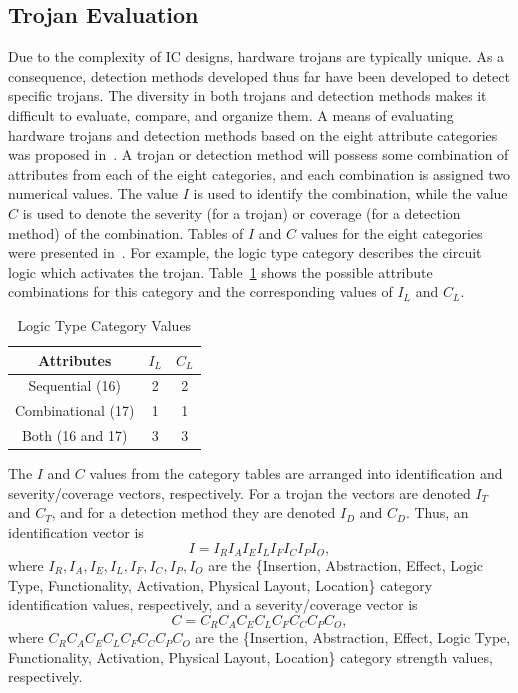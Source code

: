 \subsection{Trojan Evaluation} \label{sec:techniqueEvaluation}
Due to the complexity of IC designs, hardware trojans are typically unique.
As a consequence, detection methods developed thus far have been developed to detect specific trojans.
The diversity in both trojans and detection methods makes it difficult to evaluate, compare, and organize them.
A means of evaluating hardware trojans and detection methods based on the eight attribute categories was proposed in~\cite{samerClassDetection}.
A trojan or detection method will possess some combination of attributes from each of the eight categories, and
each combination is assigned two numerical values.
The value $I$ is used to identify the combination, while the
value $C$ is used to denote the severity (for a trojan) or coverage (for a detection method) of the combination.
Tables of $I$ and $C$ values for the eight categories were presented in~\cite{samerDissertation}.
For example, the logic type category describes the circuit logic which activates the trojan.
Table~\ref{tbl:logicTypeTable} shows the possible attribute combinations for this category and the corresponding values of $I_L$ and $C_L$.
\begin{table}[h]
	\centering
	\caption{Logic Type Category Values}
	\label{tbl:logicTypeTable}
	\begin{tabular}{|c|c|c|}
		\hline
		Attributes & $I_L$ & $C_L$ \\ \hline
		Sequential (16) & 2 & 2 \\
		Combinational (17) & 1 & 1 \\
		Both (16 and 17)& 3 & 3 \\ \hline
	\end{tabular}
\end{table}

The $I$ and $C$ values from the category tables are arranged into identification and severity/coverage vectors, respectively.
For a trojan the vectors are denoted $I_T$ and $C_T$, and for a detection method they are denoted $I_D$ and $C_D$.
Thus, an identification vector is
\[
I = I_RI_AI_EI_LI_FI_CI_PI_O,
\]
where {$I_R,I_A,I_E,I_L,I_F,I_C,I_P,I_O$} are the
\{Insertion, Abstraction, Effect, Logic Type, Functionality, Activation, Physical Layout, Location\} category identification values, respectively, and
a severity/coverage vector is
\[
C = C_RC_AC_EC_LC_FC_CC_PC_O,
\]
where {$C_RC_AC_EC_LC_FC_CC_PC_O$} are the
\{Insertion, Abstraction, Effect, Logic Type, Functionality, Activation, Physical Layout, Location\} category strength values, respectively.

